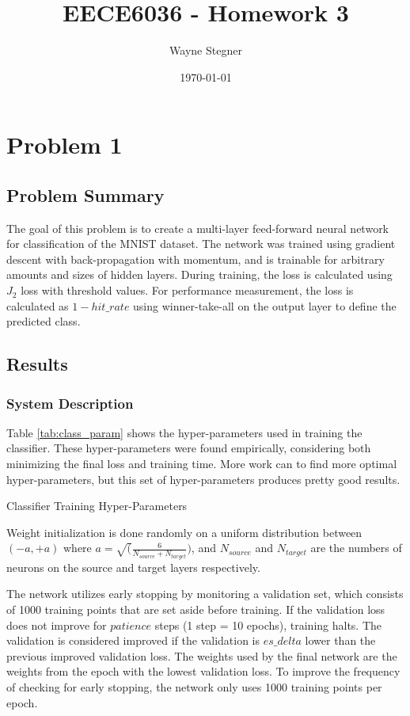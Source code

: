 \documentclass[a4paper, 12pt, titlepage]{article}
\title{EECE6036 - Homework 3}
\author{Wayne Stegner}
\date{\today}
\newcommand{\tabRef}[1]{Table \ref{#1}}
\begin{document}
  \maketitle
  \section{Problem 1}
  \subsection{Problem Summary}
  \par The goal of this problem is to create a multi-layer feed-forward neural
  network for classification of the MNIST dataset.
  The network was trained using gradient descent with back-propagation with
  momentum, and is trainable for arbitrary amounts and sizes of hidden layers.
  During training, the loss is calculated using $J_{2}$ loss with threshold
  values.
  For performance measurement, the loss is calculated as $1 - hit\_rate$ using
  winner-take-all on the output layer to define the predicted class.

  \subsection{Results}
  \subsubsection{System Description}
  \par \tabRef{tab:class_param} shows the hyper-parameters used in training the
  classifier.
  These hyper-parameters were found empirically, considering both minimizing
  the final loss and training time.
  More work can to find more optimal hyper-parameters, but this set of
  hyper-parameters produces pretty good results.
  \begin{table}[htb]
    \centering
    \vspace{-12pt}
    \caption{Classifier Training Hyper-Parameters}
    \vspace{-12pt}
    \label{tab:class_param}
    \vspace{-12pt}
  \end{table}
  \par Weight initialization is done randomly on a uniform distribution between
  $(-a, +a)$ where $a = \sqrt(\frac{6}{N_{source} + N_{target}})$, and
  $N_{source}$ and $N_{target}$ are the numbers of neurons on the source and
  target layers respectively.
  \par The network utilizes early stopping by monitoring a validation set,
  which consists of 1000 training points that are set aside before training.
  If the validation loss does not improve for $patience$ steps (1 step = 10
  epochs), training halts.
  The validation is considered improved if the validation is $es\_delta$ lower
  than the previous improved validation loss.
  The weights used by the final network are the weights from the epoch with the
  lowest validation loss.
  To improve the frequency of checking for early stopping, the network only
  uses 1000 training points per epoch.
\end{document}
